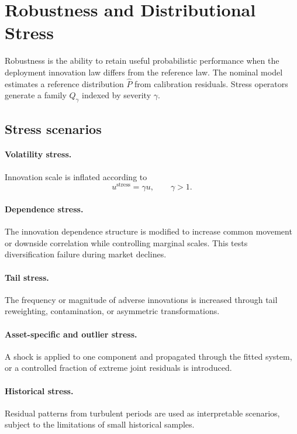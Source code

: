 \documentclass[11pt]{article}
\newcommand{\Phat}{\widehat{P}}
\begin{document}
\section{Robustness and Distributional Stress}

Robustness is the ability to retain useful probabilistic performance when the deployment innovation law differs from the reference law. The nominal model estimates a reference distribution $\Phat$ from calibration residuals. Stress operators generate a family $Q_{\gamma}$ indexed by severity $\gamma$.

\subsection{Stress scenarios}

\paragraph{Volatility stress.}
Innovation scale is inflated according to
\begin{equation}
    u^{\mathrm{stress}}=\gamma u,\qquad \gamma>1.
\end{equation}

\paragraph{Dependence stress.}
The innovation dependence structure is modified to increase common movement or downside correlation while controlling marginal scales. This tests diversification failure during market declines.

\paragraph{Tail stress.}
The frequency or magnitude of adverse innovations is increased through tail reweighting, contamination, or asymmetric transformations.

\paragraph{Asset-specific and outlier stress.}
A shock is applied to one component and propagated through the fitted system, or a controlled fraction of extreme joint residuals is introduced.

\paragraph{Historical stress.}
Residual patterns from turbulent periods are used as interpretable scenarios, subject to the limitations of small historical samples.
\end{document}

